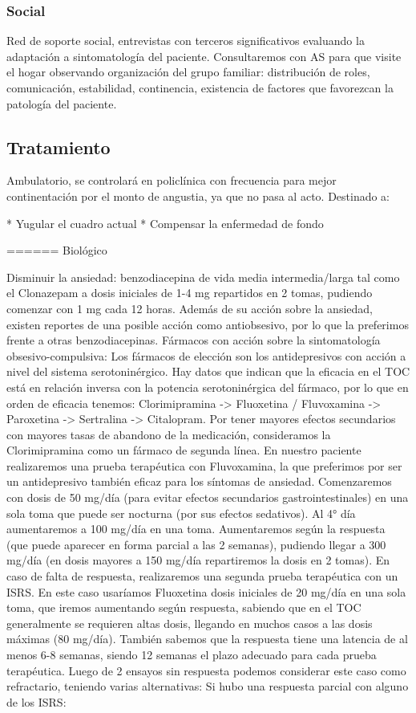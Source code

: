 \subsubsection*{Social}
Red de soporte social, entrevistas con terceros significativos evaluando la adaptación a sintomatología del paciente. Consultaremos con AS para que visite el hogar observando organización del grupo familiar: distribución de roles, comunicación, estabilidad, continencia, existencia de factores que favorezcan la patología del paciente.
\subsection*{Tratamiento}
Ambulatorio, se controlará en policlínica con frecuencia para mejor continentación por el monto de angustia, ya que no pasa al acto. Destinado a:

* Yugular el cuadro actual
* Compensar la enfermedad de fondo

====== Biológico

Disminuir la ansiedad: benzodiacepina de vida media intermedia/larga tal como el Clonazepam a dosis iniciales de 1-4 mg repartidos en 2 tomas, pudiendo comenzar con 1 mg cada 12 horas. Además de su acción sobre la ansiedad, existen reportes de una posible acción como antiobsesivo, por lo que la preferimos frente a otras benzodiacepinas. Fármacos con acción sobre la sintomatología obsesivo-compulsiva: Los fármacos de elección son los antidepresivos con acción a nivel del sistema serotoninérgico. Hay datos que indican que la eficacia en el TOC está en relación inversa con la potencia serotoninérgica del fármaco, por lo que en orden de eficacia tenemos: Clorimipramina -> Fluoxetina / Fluvoxamina -> Paroxetina -> Sertralina -> Citalopram. Por tener mayores efectos secundarios con mayores tasas de abandono de la medicación, consideramos la Clorimipramina como un fármaco de segunda línea. En nuestro paciente realizaremos una prueba terapéutica con Fluvoxamina, la que preferimos por ser un antidepresivo también eficaz para los síntomas de ansiedad. Comenzaremos con dosis de 50 mg/día (para evitar efectos secundarios gastrointestinales) en una sola toma que puede ser nocturna (por sus efectos sedativos). Al 4° día aumentaremos a 100 mg/día en una toma. Aumentaremos según la respuesta (que puede aparecer en forma parcial a las 2 semanas), pudiendo llegar a 300 mg/día (en dosis mayores a 150 mg/día repartiremos la dosis en 2 tomas). En caso de falta de respuesta, realizaremos una segunda prueba terapéutica con un ISRS. En este caso usaríamos Fluoxetina dosis iniciales de 20 mg/día en una sola toma, que iremos aumentando según respuesta, sabiendo que en el TOC generalmente se requieren altas dosis, llegando en muchos casos a las dosis máximas (80 mg/día). También sabemos que la respuesta tiene una latencia de al menos 6-8 semanas, siendo 12 semanas el plazo adecuado para cada prueba terapéutica. Luego de 2 ensayos sin respuesta podemos considerar este caso como refractario, teniendo varias alternativas: Si hubo una respuesta parcial con alguno de los ISRS:

